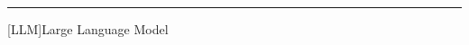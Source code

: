\documentclass[../../main.tex]{subfiles}
\begin{document}
\rule{\linewidth}{0.5mm}
  \begin{acronym}
    [LLM]{Large Language Model}
  \end{acronym}
\end{document}
